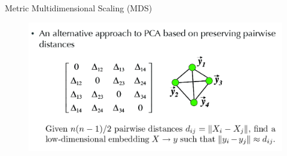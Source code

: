 \documentclass{beamer}
\theoremstyle{plain}
\theoremstyle{definition}
\theoremstyle{plain}
\theoremstyle{plain}
\begin{document}
\begin{frame}{Metric Multidimensional Scaling (MDS)}
\begin{figure}[ht]
\begin{center}
\includegraphics[width=\textwidth]{./figures/MDS.png}
\end{center}
\end{figure}

\end{frame}
\end{document}
